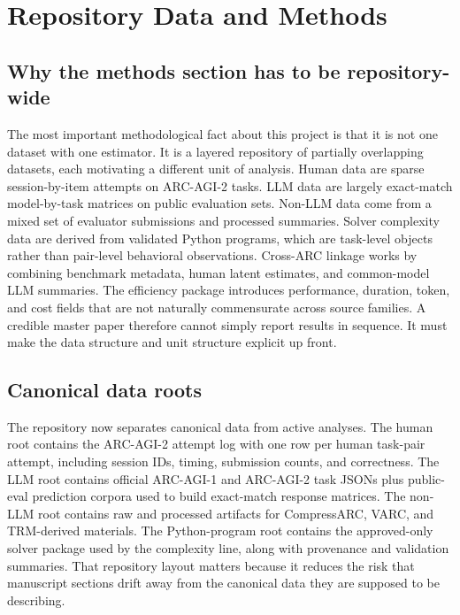\section{Repository Data and Methods}

\subsection{Why the methods section has to be repository-wide}

The most important methodological fact about this project is that it is not one dataset with one estimator. It is a layered repository of partially overlapping datasets, each motivating a different unit of analysis. Human data are sparse session-by-item attempts on ARC-AGI-2 tasks. LLM data are largely exact-match model-by-task matrices on public evaluation sets. Non-LLM data come from a mixed set of evaluator submissions and processed summaries. Solver complexity data are derived from validated Python programs, which are task-level objects rather than pair-level behavioral observations. Cross-ARC linkage works by combining benchmark metadata, human latent estimates, and common-model LLM summaries. The efficiency package introduces performance, duration, token, and cost fields that are not naturally commensurate across source families. A credible master paper therefore cannot simply report results in sequence. It must make the data structure and unit structure explicit up front.

\subsection{Canonical data roots}

The repository now separates canonical data from active analyses. The human root contains the ARC-AGI-2 attempt log with one row per human task-pair attempt, including session IDs, timing, submission counts, and correctness. The LLM root contains official ARC-AGI-1 and ARC-AGI-2 task JSONs plus public-eval prediction corpora used to build exact-match response matrices. The non-LLM root contains raw and processed artifacts for CompressARC, VARC, and TRM-derived materials. The Python-program root contains the approved-only solver package used by the complexity line, along with provenance and validation summaries. That repository layout matters because it reduces the risk that manuscript sections drift away from the canonical data they are supposed to be describing.

